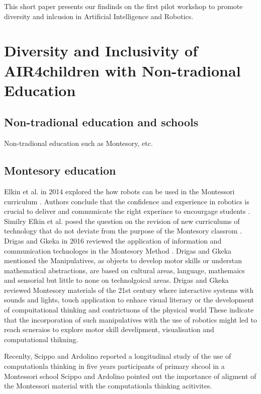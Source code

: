\documentclass[conference]{IEEEtran}
\begin{document}
This short paper presents our findinds on the first pilot workshop to promote diversity and inlcusion in Artificial Intelligence and Robotics.

\section{Diversity and Inclusivity of AIR4children with Non-tradional Education}

\subsection{Non-tradional education and schools}
Non-tradional education such as Montesory, etc.




\subsection{Montesory education}
Elkin et al. in 2014 explored the how robots can be used in the Montessori curriculum \cite{elkin2014}.
Authors conclude that the confidence and experience in robotics is crucial to deliver and communicate the right experince to encourgage students \cite{elkin2014}.
Similry Elkin et al. posed the question on the revision of new curriculums of technology that do not deviate from the purpose of the Montesory classrom \cite{elkin2014}.
Drigas and Gkeka in 2016 reviewed the application of information and communication technologes in the Montesory Method \cite{DrigasGkeka2016}.
Drigas and Gkeka mentioned the Manipulatives, as objects to develop motor skills or understan mathematical abstractions, are based on cultural areas, language, mathemaics and sensorial but little to none on technolgoical areas.
Drigas and Gkeka reviewed Montesory materials of the 21st century where interactive systems with sounds and lights, touch application to enhace visual literacy or the development of compuitational thinking and contrictuons of the physical world \cite{DrigasGkeka2016}
These indicate that the incorporation of such manipulatives with the use of robotics might led to reach scneraios to explore motor skill develipment, visualisation and computational thikning. 

Recenlty, Scippo and Ardolino reported a longitudinal study of the use of computationla thinking in five years participants of primary shcool in a Montessori school \cite{ScippoArdolino2021}
Scippo and Ardolino pointed out the importance of aligment of the Montessori material with the computationla thinking acitivites. 
\end{document}
